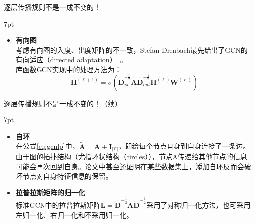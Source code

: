 \documentclass{beamer}
\newenvironment{formal}{%
	\def\FrameCommand{%
		\hspace{1pt}%
		{\color{deepgreen}\vrule width 2pt}%
		{\color{greenshade}\vrule width 4pt}%
		\colorbox{greenshade}%
	}%
	\MakeFramed{\advance\hsize-\width\FrameRestore}%
	\noindent\hspace{-4.55pt}%
	\begin{adjustwidth}{}{7pt}%
		\vspace{2pt}\vspace{2pt}%
	}
	{%
		\vspace{2pt}
	\end{adjustwidth}\endMakeFramed%
}
\begin{document}
\begin{frame}{逐层传播规则不是一成不变的！}
	\begin{formal}
		\begin{itemize}
			\item {\color{red}\textbf{有向图}} \\
			考虑{\color{red}有向图的入度、出度矩阵的不一致}，Stefan Drenbach最先给出了GCN的有向适应（directed adaptation）~\cite{dernbach2018directed}。\\
			{\color{red}库函数GCN实现}中的处理方法为：
			\begin{equation}
				\textbf{H}^{\left(\ell+1\right)}=\sigma\left(\tilde{\textbf{D}}_{in}^{-\frac{1}{2}}\tilde{\textbf{A}}\tilde{\textbf{D}}_{out}^{-\frac{1}{2}}\textbf{H}^{\left(\ell\right)}\textbf{W}^{\left(\ell\right)}\right)
			\end{equation}
		\end{itemize}
	\end{formal}
\end{frame}

\begin{frame}{逐层传播规则不是一成不变的！（续）}
	\begin{formal}
		\begin{itemize}
			\item {\color{red}\textbf{自环}} \\
			在公式\ref{eq:gcnlp}中，$\tilde{\textbf{A}}=\textbf{A}+\textbf{I}_{\left|\mathscr{V}\right|}$，即给每个节点自身到自身连接了一条边。由于图的拓扑结构（尤指环状结构（circles）），节点A传递给其他节点的信息可能会再次回到自身。论文\cite{lampert2023loop}中甚至还证明在某些数据集上，添加自环反而会破坏节点对自身特征信息的保留。
			\item {\color{red}\textbf{拉普拉斯矩阵的归一化}} \\
			标准GCN中的拉普拉斯矩阵$\textbf{L}=\tilde{\textbf{D}}^{-\frac{1}{2}}\tilde{\textbf{A}}\tilde{\textbf{D}}^{-\frac{1}{2}}$采用了对称归一化方法，也可采用左归一化、右归一化和不采用归一化。
		\end{itemize}
	\end{formal}
\end{frame}
\end{document}
